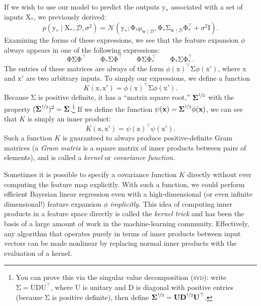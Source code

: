 \documentclass{article}
\newcommand{\acro}[1]{\textsc{\MakeLowercase{#1}}}
\newcommand{\given}{\mid}
\newcommand{\mc}[1]{\mathcal{#1}}
\newcommand{\data}{\mc{D}}
\newcommand{\trans}{^\top}
\newcommand{\mat}[1]{\bm{\mathrm{#1}}}
\renewcommand{\vec}[1]{\bm{\mathrm{#1}}}
\begin{document}
If we wish to use our model to predict the outputs $\vec{y}_\ast$
associated with a set of inputs $\mat{X}_\ast$, we previously derived:
\begin{equation*}
  p(\vec{y}_\ast \given \mat{X}_\ast, \data, \sigma^2)
  =
  \mc{N}(
  \vec{y}_\ast;
  \mat{\Phi}_\ast \vec{\mu}_{\vec{w}\given\data},
  \mat{\Phi}_\ast \mat{\Sigma}_{\vec{w}\given\data} \mat{\Phi}_\ast\trans + \sigma^2 \mat{I}).
\end{equation*}
Examining the forms of these expressions, we see that the feature
expansion $\phi$ always appears in one of the following expressions:
\begin{equation*}
  \mat{\Phi}\mat{\Sigma}\mat{\Phi}\trans
  \qquad
  \mat{\Phi}_\ast\mat{\Sigma}\mat{\Phi}\trans
  \qquad
  \mat{\Phi}\mat{\Sigma}\mat{\Phi}_\ast\trans
  \qquad
  \mat{\Phi}_\ast\mat{\Sigma}\mat{\Phi}_\ast\trans.
\end{equation*}
The entries of these matrices are always of the form
$\phi(\vec{x})\trans \mat{\Sigma} \phi(\vec{x}')$, where $\vec{x}$ and
$\vec{x}'$ are two arbitrary inputs.  To simply our expressions, we
define a function
\begin{equation*}
  K(\vec{x}, \vec{x}')
  =
  \phi(\vec{x})\trans\mat{\Sigma}\phi(\vec{x}').
\end{equation*}
Because $\mat{\Sigma}$ is positive definite, it has a ``matrix square
root,'' $\mat{\Sigma}^{\nicefrac{1}{2}}$ with the property
$(\mat{\Sigma}^{\nicefrac{1}{2}})^2 = \mat{\Sigma}$.\footnote{You can
  prove this via the singular value decomposition (\acro{SVD}): write
  $\mat{\Sigma} = \mat{U}\mat{D}\mat{U}\trans$, where $\mat{U}$ is
  unitary and $\mat{D}$ is diagonal with positive entries (because
  $\mat{\Sigma}$ is positive definite), then define
  $\mat{\Sigma}^{\nicefrac{1}{2}} =
  \mat{U}\mat{D}^{\nicefrac{1}{2}}\mat{U}\trans$.} If we define the
function $\psi(\vec{x}) =
\mat{\Sigma}^{\nicefrac{1}{2}}\phi(\vec{x})$, we can see that
$K$ is simply an inner product:
\begin{equation*}
  K(\vec{x}, \vec{x}')
  =
  \psi(\vec{x})\trans \psi(\vec{x}').
\end{equation*}
Such a function $K$ is guaranteed to always produce positive-definite
Gram matrices (a \emph{Gram matrix} is a square matrix of inner
products between pairs of elements), and is called a \emph{kernel} or
\emph{covariance function.}

Sometimes it is possible to specify a covariance function $K$ directly
without ever computing the feature map explicitly.  With such a
function, we could perform efficient Bayesian linear regression even
with a high-dimensional (or even infinite dimensional!) feature
expansion $\phi$ \emph{implicitly.} This idea of computing inner
products in a feature space directly is called the \emph{kernel trick}
and has been the basis of a large amount of work in the
machine-learning community.  Effectively, any algorithm that operates
purely in terms of inner products between input vectors can be made
nonlinear by replacing normal inner products with the evaluation of a
kernel.
\end{document}
